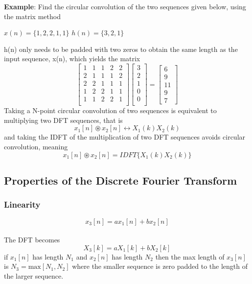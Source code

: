 \documentclass{article}
\begin{document}
\vspace{1em}
\textbf{Example}: Find the circular convolution of the two sequences given below, using the
matrix method
\begin{center}
$x(n) =\{1,2,2,1,1\}$ \space \space \space $h(n) =\{3,2,1\}$
\end{center}
h(n) only needs to be padded with two zeros to obtain the same length as the input sequence, x(n), which yields the matrix
\[
\begin{bmatrix}
   1  & 1 & 1 & 2 & 2 \\
    2 & 1 & 1 & 1 & 2   \\
    2  & 2 & 1 & 1 & 1 \\
    1 & 2 & 2 & 1 & 1   \\  
    1 & 1 & 2 & 2 & 1   \\ 
\end{bmatrix}
\begin{bmatrix}
    3 \\
    2  \\
    1 \\
    0  \\
    0 \\ 
\end{bmatrix}=
\begin{bmatrix}
    6 \\
    9  \\
    11 \\
    9 \\
    7 
\end{bmatrix}
\]
Taking a N-point circular convolution of two sequences is equivalent to multiplying two DFT sequences, that is 
\begin{equation}
x_1[n]\circledast x_2[n]\leftrightarrow X_1(k)X_2(k)
\end{equation}
and taking the IDFT of the multiplication of two DFT sequences avoids circular convolution, meaning 
\begin{equation}
x_1[n]\circledast x_2[n]=IDFT\{ X_1(k)X_2(k)\}
\end{equation}
\subsection{Properties of the Discrete Fourier Transform}
\subsubsection{Linearity}
\begin{equation}
x_3[n]=ax_1[n]+bx_2[n]    
\end{equation} \\
The DFT becomes \\
\begin{equation}
X_3[k]=aX_1[k]+bX_2[k]   
\end{equation} 
if $x_1[n]$ has length $N_1$ and $x_2[n]$ has length $N_2$ then the max length of $x_3[n]$ is $N_3=\text{max}[N_1,N_2]$ where the smaller sequence is zero padded to the length of the larger sequence. 
\end{document}
